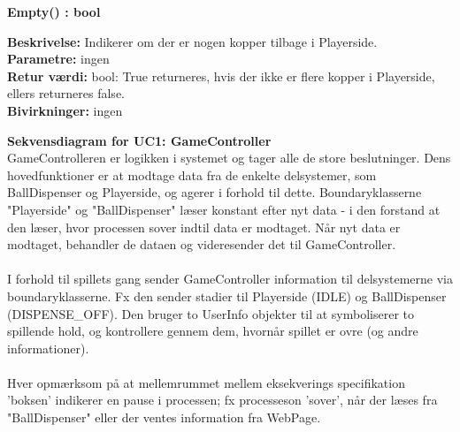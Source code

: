 \documentclass[Arkitektur/System_main.tex]{subfiles}
\begin{document}
\textbf{Empty() : bool}
\begin{adjustwidth}{1cm}{0pt}
\textbf{Beskrivelse:} Indikerer om der er nogen kopper tilbage i Playerside.\\
\textbf{Parametre:} ingen \\[0.2cm]
\textbf{Retur værdi:} bool: True returneres, hvis der ikke er flere kopper i Playerside, ellers returneres false.\\[0.2cm]
\textbf{Bivirkninger:} ingen \\[0.2cm]
\end{adjustwidth}

\textbf{Sekvensdiagram for UC1: GameController}\\
GameControlleren er logikken i systemet og tager alle de store beslutninger. Dens hovedfunktioner er at modtage data fra de enkelte delsystemer, som BallDispenser og Playerside, og agerer i forhold til dette. Boundaryklasserne "Playerside" og "BallDispenser" læser konstant efter nyt data - i den forstand at den læser, hvor processen sover indtil data er modtaget. Når nyt data er modtaget, behandler de dataen og videresender det til GameController. \\\\
I forhold til spillets gang sender GameController information til delsystemerne via boundaryklasserne. Fx den sender stadier til Playerside (IDLE) og BallDispenser (DISPENSE\_OFF). Den bruger to UserInfo objekter til at symboliserer to spillende hold, og kontrollere gennem dem, hvornår spillet er ovre (og andre informationer). \\\\
Hver opmærksom på at mellemrummet mellem eksekverings specifikation 'boksen' indikerer en pause i processen; fx processeson 'sover', når der læses fra "BallDispenser" eller der ventes information fra WebPage. 
\end{document}
